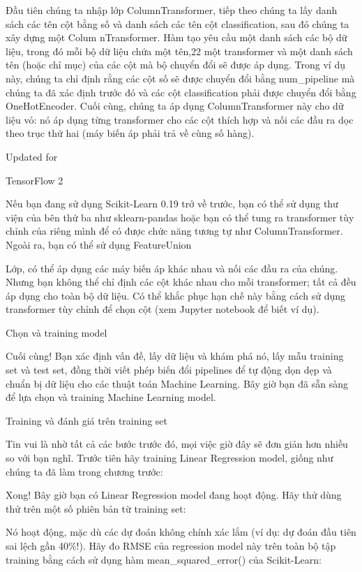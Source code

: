 Đầu tiên chúng ta nhập lớp ColumnTransformer, tiếp theo chúng ta lấy danh sách các tên cột bằng số và danh sách các tên cột classification, sau đó chúng ta xây dựng một Colum nTransformer. Hàm tạo yêu cầu một danh sách các bộ dữ liệu, trong đó mỗi bộ dữ liệu chứa một tên,22 một transformer và một danh sách tên (hoặc chỉ mục) của các cột mà bộ chuyển đổi sẽ được áp dụng. Trong ví dụ này, chúng ta chỉ định rằng các cột số sẽ được chuyển đổi bằng num\_pipeline mà chúng ta đã xác định trước đó và các cột classification phải được chuyển đổi bằng OneHotEncoder. Cuối cùng, chúng ta áp dụng ColumnTransformer này cho dữ liệu vỏ: nó áp dụng từng transformer cho các cột thích hợp và nối các đầu ra dọc theo trục thứ hai (máy biến áp phải trả về cùng số hàng).

Updated for

TensorFlow 2

Nếu bạn đang sử dụng Scikit-Learn 0.19 trở về trước, bạn có thể sử dụng thư viện của bên thứ ba như sklearn-pandas hoặc bạn có thể tung ra transformer tùy chỉnh của riêng mình để có được chức năng tương tự như ColumnTransformer. Ngoài ra, bạn có thể sử dụng FeatureUnion

Lớp, có thể áp dụng các máy biến áp khác nhau và nối các đầu ra của chúng. Nhưng bạn không thể chỉ định các cột khác nhau cho mỗi transformer; tất cả đều áp dụng cho toàn bộ dữ liệu. Có thể khắc phục hạn chế này bằng cách sử dụng transformer tùy chỉnh để chọn cột (xem Jupyter notebook để biết ví dụ).

Chọn và training model

Cuối cùng! Bạn xác định vấn đề, lấy dữ liệu và khám phá nó, lấy mẫu training set và test set, đồng thời viết phép biến đổi pipelines để tự động dọn dẹp và chuẩn bị dữ liệu cho các thuật toán Machine Learning. Bây giờ bạn đã sẵn sàng để lựa chọn và training Machine Learning model.

Training và đánh giá trên training set

Tin vui là nhờ tất cả các bước trước đó, mọi việc giờ đây sẽ đơn giản hơn nhiều so với bạn nghĩ. Trước tiên hãy training Linear Regression model, giống như chúng ta đã làm trong chương trước:

Xong! Bây giờ bạn có Linear Regression model đang hoạt động. Hãy thử dùng thử trên một số phiên bản từ training set:

Nó hoạt động, mặc dù các dự đoán không chính xác lắm (ví dụ: dự đoán đầu tiên sai lệch gần 40\%!). Hãy đo RMSE của regression model này trên toàn bộ tập training bằng cách sử dụng hàm mean\_squared\_error() của Scikit-Learn:

